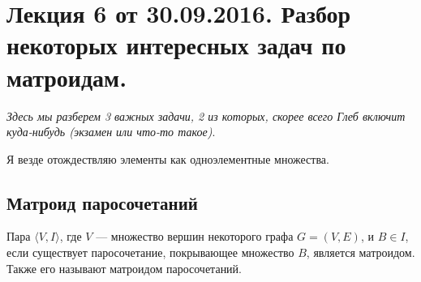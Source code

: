 \documentclass[a4paper, 12pt]{article}
\begin{document}
\pagestyle{fancy}

\section{Лекция 6 от 30.09.2016. Разбор некоторых интересных
задач по матроидам.}

\textit{Здесь мы разберем 3 важных задачи, 2 из которых, скорее всего Глеб включит
куда-нибудь (экзамен или что-то такое)}.

Я везде отождествляю элементы как одноэлементные множества.

\subsection{Матроид паросочетаний}

\begin{Lemma}
  Пара $\langle V, I\rangle$, где $V$ --- множество вершин
  некоторого графа $G = (V, E)$, и $B \in I$, если существует
  паросочетание, покрывающее множество $B$, является матроидом. Также его называют
  матроидом паросочетаний.
\end{Lemma}
\end{document}
